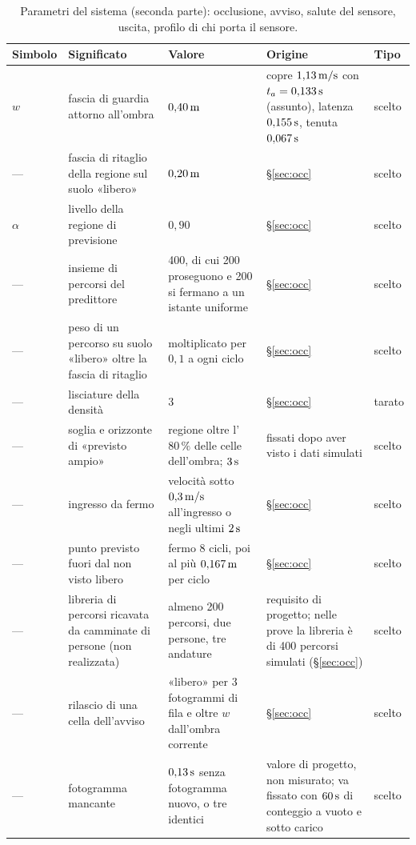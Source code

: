 \begin{table}[H]\centering\footnotesize
\caption{Parametri del sistema (seconda parte): occlusione, avviso, salute del sensore, uscita, profilo di chi porta il sensore.}\label{tab:par-parametri-due}
\begin{tabularx}{\linewidth}{@{}p{1.25cm}Lp{3.5cm}Lp{1.2cm}@{}}
\toprule
Simbolo & Significato & Valore & Origine & Tipo\\
\midrule
$w$ & fascia di guardia attorno all'ombra & $0{,}40\,\mathrm{m}$ & copre $1{,}13\,\mathrm{m/s}$ con $t_a=0{,}133\,\mathrm{s}$ (assunto), latenza $0{,}155\,\mathrm{s}$, tenuta $0{,}067\,\mathrm{s}$ & scelto\\
--- & fascia di ritaglio della regione sul suolo «libero» & $0{,}20\,\mathrm{m}$ & \S\ref{sec:occ} & scelto\\
$\alpha$ & livello della regione di previsione & $0{,}90$ & \S\ref{sec:occ} & scelto\\
--- & insieme di percorsi del predittore & 400, di cui 200 proseguono e 200 si fermano a un istante uniforme & \S\ref{sec:occ} & scelto\\
--- & peso di un percorso su suolo «libero» oltre la fascia di ritaglio & moltiplicato per $0{,}1$ a ogni ciclo & \S\ref{sec:occ} & scelto\\
--- & lisciature della densità & 3 & \S\ref{sec:occ} & tarato\\
--- & soglia e orizzonte di «previsto ampio» & regione oltre l'$80\,\%$ delle celle dell'ombra; $3\,\mathrm{s}$ & fissati dopo aver visto i dati simulati & scelto\\
--- & ingresso da fermo & velocità sotto $0{,}3\,\mathrm{m/s}$ all'ingresso o negli ultimi $2\,\mathrm{s}$ & \S\ref{sec:occ} & scelto\\
--- & punto previsto fuori dal non visto libero & fermo 8 cicli, poi al più $0{,}167\,\mathrm{m}$ per ciclo & \S\ref{sec:occ} & scelto\\
--- & libreria di percorsi ricavata da camminate di persone (non realizzata) & almeno 200 percorsi, due persone, tre andature & requisito di progetto; nelle prove la libreria è di 400 percorsi simulati (\S\ref{sec:occ}) & scelto\\
--- & rilascio di una cella dell'avviso & «libero» per 3 fotogrammi di fila e oltre $w$ dall'ombra corrente & \S\ref{sec:occ} & scelto\\
--- & fotogramma mancante & $0{,}13\,\mathrm{s}$ senza fotogramma nuovo, o tre identici & valore di progetto, non misurato; va fissato con $60\,\mathrm{s}$ di conteggio a vuoto e sotto carico & scelto\\

\end{tabularx}
\end{table}
